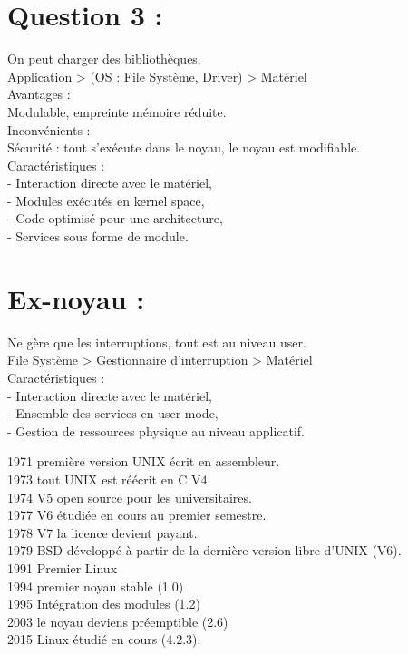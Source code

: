 \documentclass[11pt,a4paper]{report}
\begin{document}
\section{Question 3 :}

On peut charger des bibliothèques.\\
Application > (OS : File Système, Driver) > Matériel\\
Avantages :\\
Modulable, empreinte mémoire réduite.\\
Inconvénients :\\
Sécurité : tout s’exécute dans le noyau, le noyau est modifiable.\\
Caractéristiques :\\
- Interaction directe avec le matériel,\\
- Modules exécutés en kernel space,\\
- Code optimisé pour une architecture,\\
- Services sous forme de module.

\section{Ex-noyau :}

Ne gère que les interruptions, tout est au niveau user.\\
File Système > Gestionnaire d’interruption > Matériel\\
Caractéristiques :\\
- Interaction directe avec le matériel,\\
- Ensemble des services en user mode,\\
- Gestion de ressources physique au niveau applicatif.

1971 première version UNIX écrit en assembleur.\\
1973 tout UNIX est réécrit en C V4.\\
1974 V5 open source pour les universitaires.\\
1977 V6 étudiée en cours au premier semestre.\\
1978 V7 la licence devient payant.\\
1979 BSD développé à partir de la dernière version libre d’UNIX (V6).\\
1991 Premier Linux\\
1994 premier noyau stable (1.0)\\
1995 Intégration des modules (1.2)\\
2003 le noyau deviens préemptible (2.6)\\
2015 Linux étudié en cours (4.2.3).
\end{document}
